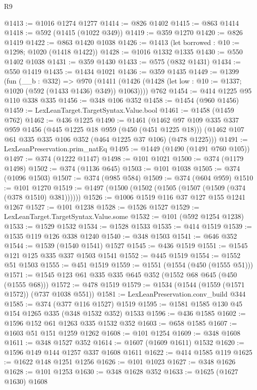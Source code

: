 \begin{lexlean}{R9}
\begin{coremodule}
@1413 := @1016 @1274 @1277
@1414 := @826 @1402
@1415 := @863 @1414
@1418 := @592 (@1415 (@1022 @349))
@1419 := @359 @1270
@1420 := @826 @1419
@1422 := @863 @1420 @1038
@1426 := @1413 (let borrowed : @10 := @1298; @1020 (@1418 @1422))
@1428 := @1016 @1332 @1335
@1430 := @550 @1402 @1038
@1431 := @359 @1430
@1433 := @575 (@832 @1431)
@1434 := @550 @1419
@1435 := @1434 @1021
@1436 := @359 @1435
@1449 := @1399
    (fun (__b : @332) =>
    @970 (@1411 (@1426 (@1428 (let low : @10 := @1337; @1020 (@592 (@1433 @1436) @349)) @1063))))
    @762
@1454 := @414 @1225 @95 @110 @338 @335
@1456 := @348 @106 @352
@1458 := @1454 (@960 @1456)
@1459 := LexLeanTarget.TargetSyntax.Value.bool
@1461 := @1458 (@1459 @762)
@1462 := @436 @1225
@1490 := @1461
    (@1462
      @97
      @109
      @335
      @337
      @959
      @1456
      (@445 @1225 @18 @959 (@450 (@451 @1225 @18)))
      (@1462 @107 @61 @335 @335 @106 @352 (@464 @1225 @37 @106) (@478 @1225)))
@1491 := LexLeanPreservation.prim_natEq
@1495 := @1449 (@1490 (@1491 @760 @105))
@1497 := @374 (@1222 @1147)
@1498 := @101 @1021
@1500 := @374 (@1179 @1498)
@1502 := @374 (@1136 @645)
@1503 := @101 @1038
@1505 := @374 (@1096 @1503)
@1507 := @374 (@985 @584)
@1509 := @374 (@604 @959)
@1510 := @101 @1270
@1519 := @1497 (@1500 (@1502 (@1505 (@1507 (@1509 (@374 (@378 @1510) @381))))))
@1526 := @1006 @1519 @116 @37 @127 @155 @1241 @1267
@1527 := @101 @1238
@1528 := @1526 @1527
@1529 := LexLeanTarget.TargetSyntax.Value.some
@1532 := @101 (@592 @1254 @1238)
@1533 := @1529 @1532
@1534 := @1528 @1533
@1535 := @414 @1519
@1539 := @1535 @119 @126 @338 @1240
@1540 := @348 @1503
@1541 := @646 @352
@1544 := @1539 (@1540 @1541) @1527
@1545 := @436 @1519
@1551 := @1545 @121 @125 @335 @337 @1503 @1541
@1552 := @445 @1519
@1554 := @1552 @51 @1503
@1555 := @451 @1519
@1559 := @1551 (@1554 (@450 (@1555 @51)))
@1571 := @1545 @123 @61 @335 @335 @645 @352 (@1552 @68 @645 (@450 (@1555 @68)))
@1572 := @478 @1519
@1579 := @1534 (@1544 (@1559 (@1571 @1572)) (@737 @1038 @551))
@1581 := LexLeanPreservation.conv_build @344
@1585 := @374 (@377 @116 @1527) @1519
@1595 := @1581 @1585 @130 @45 @154 @1265 @335 (@348 @1532 @352) @1533
@1596 := @436 @1585
@1602 := @1596 @152 @61 @1263 @335 @1532 @352
@1603 := @658 @1585
@1607 := @1603 @51 @151 @1259 @1262
@1608 := @101 @1254
@1609 := @348 @1608
@1611 := @348 @1527 @352
@1614 := @1607 (@1609 @1611) @1532
@1620 := @1596 @149 @144 @1257 @337 @1608 @1611
@1622 := @414 @1585 @119
@1625 := @1622 @148 @1251 @1256
@1626 := @101 @1023
@1627 := @348 @1626
@1628 := @101 @1253
@1630 := @348 @1628 @352
@1633 := @1625 (@1627 @1630) @1608

\end{coremodule}
\end{lexlean}
